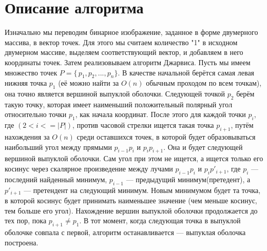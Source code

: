 \documentclass{report}
\begin{document}
\section*{Описание алгоритма}
Изначально мы переводим бинарное изображение, заданное в форме двумерного массива, в вектор точек. Для этого мы считаем количество "1" в исходном двумерном массиве, выделяем соответствующий вектор, и добавляем в него координаты точек. Затем реализовываем алгоритм Джарвиса. Пусть мы имеем множество точек $P=\{\,p_1, p_2, ..., p_n\}$. В качестве начальной берётся самая левая нижняя точка $p_1$ (её можно найти за $O(n)$ обычным проходом по всем точкам), она точно является вершиной выпуклой оболочки. Следующей точкой  $p_2$ берём такую точку, которая имеет наименьший положительный полярный угол относительно точки $p_1$, как начала координат. После этого для каждой точки $p_i$, где $(2<i<=|P|)$, против часовой стрелки ищется такая точка $p_{i+1}$, путём нахождения за $O(n)$ среди оставшихся точек, в которой будет образовываться наибольший угол между прямыми $p_{i-1} p_i$ и $p_{i}p_{i+1}$. Она и будет следующей вершиной выпуклой оболочки. Сам угол при этом не ищется, а ищется только его косинус через скалярное произведение между лучами  $p_{i-1}p_{i}$ и $p_{i}p'_{i+1}$, где  $p_{i}$ — последний найденный минимум,  $p_{i-1}$ — предыдущий минимум(претедент), а $p'_{i+1}$ — претендент на следующий минимум. Новым минимумом будет та точка, в которой косинус будет принимать наименьшее значение (чем меньше косинус, тем больше его угол). Нахождение вершин выпуклой оболочки продолжается до тех пор, пока $p_{i+1}\neq p_{1}$. В тот момент, когда следующая точка в выпуклой оболочке совпала с первой, алгоритм останавливается — выпуклая оболочка построена.
\newpage

\end{document}
